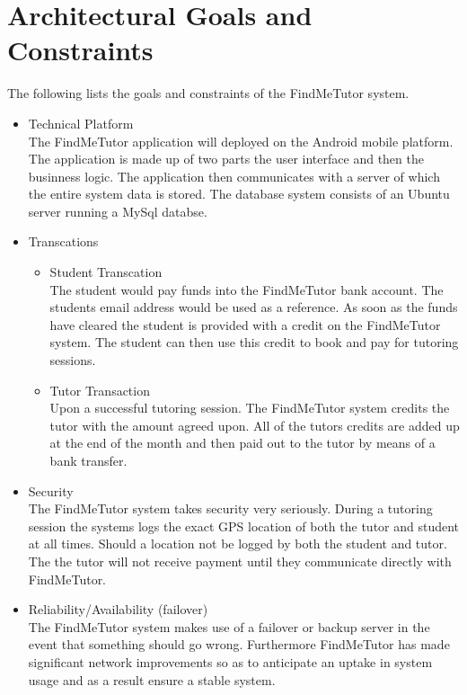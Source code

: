 \documentclass[12pt]{article}
\begin{document}
\section{Architectural Goals and Constraints}
The following lists the goals and constraints of the FindMeTutor system.
\begin{itemize}

\item Technical Platform\\
The FindMeTutor application will deployed on the Android mobile platform. The application is made up of two parts the user interface and then the businness logic. The application then communicates with a server of which the entire system data is stored. The database system consists of an Ubuntu server running a MySql databse.

\item Transcations
\begin{itemize}

\item Student Transcation\\
The student would pay funds into the FindMeTutor bank account. The students email address would be used as a reference. As soon as the funds have cleared the student is provided with a credit on the FindMeTutor system. The student can then use this credit to book and pay for tutoring sessions.

\item Tutor Transaction\\
Upon a successful tutoring session. The FindMeTutor system credits the tutor with the amount agreed upon. All of the tutors credits are added up at the end of the month and then paid out to the tutor by means of a bank transfer.
\end{itemize}

\item Security\\
The FindMeTutor system takes security very seriously. During a tutoring session the systems logs the exact GPS location of both the tutor and student at all times. Should a location not be logged by both the student and tutor. The the tutor will not receive payment until they communicate directly with FindMeTutor.

\item Reliability/Availability (failover)\\
The FindMeTutor system makes use of a failover or backup server in the event that something should go wrong. Furthermore FindMeTutor has made significant network improvements so as to anticipate an uptake in system usage and as a result ensure a stable system.
\end{itemize}
\end{document}
